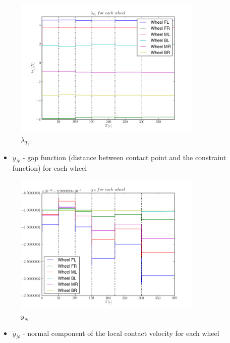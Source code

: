 \begin{figure}[H]
  \centering
    \includegraphics[width=0.8\textwidth]{lambdaTz3}
  \caption{$\lambda_{T_z}$}
\end{figure}

\begin{itemize}
  \item $y_{N}$ - gap function (distance between contact point and the constraint function) for each wheel
\end{itemize}

\begin{figure}[H]
  \centering
    \includegraphics[width=0.8\textwidth]{yN3}
  \caption{$y_N$}
\end{figure}

\begin{itemize}
  \item $\dot{y}_{N}$ - normal component of the local contact velocity for each wheel
\end{itemize}

